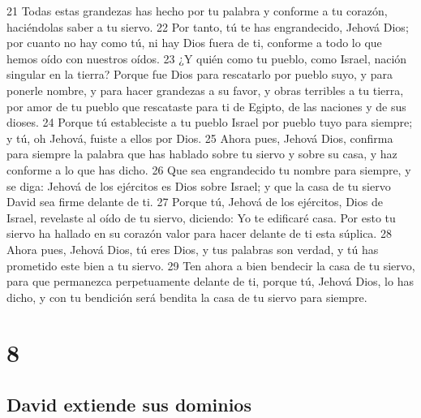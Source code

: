 21 Todas estas grandezas has hecho por tu palabra y conforme a tu corazón, haciéndolas saber a tu siervo.
22 Por tanto, tú te has engrandecido, Jehová Dios; por cuanto no hay como tú, ni hay Dios fuera de ti, conforme a todo lo que hemos oído con nuestros oídos.
23 ¿Y quién como tu pueblo, como Israel, nación singular en la tierra? Porque fue Dios para rescatarlo por pueblo suyo, y para ponerle nombre, y para hacer grandezas a su favor, y obras terribles a tu tierra, por amor de tu pueblo que rescataste para ti de Egipto, de las naciones y de sus dioses.
24 Porque tú estableciste a tu pueblo Israel por pueblo tuyo para siempre; y tú, oh Jehová, fuiste a ellos por Dios.
25 Ahora pues, Jehová Dios, confirma para siempre la palabra que has hablado sobre tu siervo y sobre su casa, y haz conforme a lo que has dicho.
26 Que sea engrandecido tu nombre para siempre, y se diga: Jehová de los ejércitos es Dios sobre Israel; y que la casa de tu siervo David sea firme delante de ti.
27 Porque tú, Jehová de los ejércitos, Dios de Israel, revelaste al oído de tu siervo, diciendo: Yo te edificaré casa. Por esto tu siervo ha hallado en su corazón valor para hacer delante de ti esta súplica.
28 Ahora pues, Jehová Dios, tú eres Dios, y tus palabras son verdad, y tú has prometido este bien a tu siervo.
29 Ten ahora a bien bendecir la casa de tu siervo, para que permanezca perpetuamente delante de ti, porque tú, Jehová Dios, lo has dicho, y con tu bendición será bendita la casa de tu siervo para siempre.

\chapter{8}

\section*{David extiende sus dominios}

